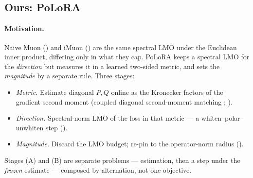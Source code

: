 \documentclass[11pt]{article}
\newcommand{\methodname}{PoLoRA\xspace}
\theoremstyle{plain}
\theoremstyle{definition}
\theoremstyle{remark}
\begin{document}
\subsection{Ours: \methodname}
\label{sec:method-ours}
\paragraph{Motivation.} Naive Muon () and iMuon () are the same spectral LMO under the Euclidean inner product, differing only in what they cap. \methodname{} keeps a spectral LMO for the \emph{direction} but measures it in a learned two-sided metric, and sets the \emph{magnitude} by a separate rule. Three stages:
\begin{itemize}[leftmargin=1.7em,itemsep=1pt,topsep=2pt]
  \item[(A)] \emph{Metric.} Estimate diagonal $P,Q$ online as the Kronecker factors of the gradient second moment (coupled diagonal second-moment matching \cite{klshampoo}; ).
  \item[(B)] \emph{Direction.} Spectral-norm LMO of the loss in that metric --- a whiten--polar--unwhiten step ().
  \item[(C)] \emph{Magnitude.} Discard the LMO budget; re-pin to the operator-norm radius ().
\end{itemize}
Stages (A) and (B) are separate problems --- estimation, then a step under the \emph{frozen} estimate --- composed by alternation, not one objective.
\end{document}
